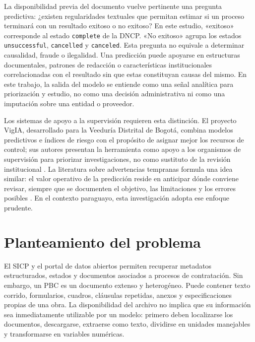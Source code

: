La disponibilidad previa del documento vuelve pertinente una pregunta predictiva: ¿existen regularidades textuales que permitan estimar si un proceso terminará con un resultado exitoso o no exitoso? En este estudio, «exitoso» corresponde al estado \texttt{complete} de la DNCP. «No exitoso» agrupa los estados \texttt{unsuccessful}, \texttt{cancelled} y \texttt{canceled}. Esta pregunta no equivale a determinar causalidad, fraude o ilegalidad. Una predicción puede apoyarse en estructuras documentales, patrones de redacción o características institucionales correlacionadas con el resultado sin que estas constituyan causas del mismo. En este trabajo, la salida del modelo se entiende como una señal analítica para priorización y estudio, no como una decisión administrativa ni como una imputación sobre una entidad o proveedor.

Los sistemas de apoyo a la supervisión requieren esta distinción. El proyecto VigIA, desarrollado para la Veeduría Distrital de Bogotá, combina modelos predictivos e índices de riesgo con el propósito de asignar mejor los recursos de control; sus autores presentan la herramienta como apoyo a los organismos de supervisión para priorizar investigaciones, no como sustituto de la revisión institucional \parencite{salazar2024vigia}. La literatura sobre advertencias tempranas formula una idea similar: el valor operativo de la predicción reside en anticipar dónde conviene revisar, siempre que se documenten el objetivo, las limitaciones y los errores posibles \parencite{gallego2021earlywarning}. En el contexto paraguayo, esta investigación adopta ese enfoque prudente.



\section{Planteamiento del problema}

El SICP y el portal de datos abiertos permiten recuperar metadatos estructurados, estados y documentos asociados a procesos de contratación. Sin embargo, un PBC es un documento extenso y heterogéneo. Puede contener texto corrido, formularios, cuadros, cláusulas repetidas, anexos y especificaciones propias de una obra. La disponibilidad del archivo no implica que su información sea inmediatamente utilizable por un modelo: primero deben localizarse los documentos, descargarse, extraerse como texto, dividirse en unidades manejables y transformarse en variables numéricas.

